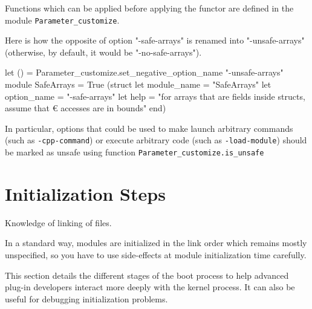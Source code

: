 Functions which can be applied before applying the functor are defined in the
module \texttt{Parameter\_customize}.
\begin{example}
Here is how the opposite of option "-safe-arrays" is renamed into
"-unsafe-arrays" (otherwise, by default, it would be "-no-safe-arrays").
\begin{ocamlcode}
let () = Parameter_customize.set_negative_option_name "-unsafe-arrays"
module SafeArrays =
  True
    (struct
       let module_name = "SafeArrays"
       let option_name = "-safe-arrays"
       let help = "for arrays that are fields inside structs, assume that €
                   accesses are in bounds"
     end)
\end{ocamlcode}
\end{example}

\begin{important}
In particular, options that could be used to make \framac launch arbitrary
commands (such as \lstinline|-cpp-command|) or execute arbitrary code
(such as \lstinline|-load-module|) should be marked as unsafe using function
\texttt{Parameter\_customize.is\_unsafe}
\end{important}


\section{Initialization Steps}\label{adv:init}

\begin{prereq}
  Knowledge of linking of \caml files.
\end{prereq}

\begin{important}
  In a standard way, \framac modules are initialized in the link
  order which remains mostly unspecified, so you have to use
  side-effects at module initialization time carefully.
\end{important}

This section details the different stages of the \framac boot process
to help advanced plug-in developers interact more deeply with
the kernel process. It can also be useful for debugging initialization
problems.

